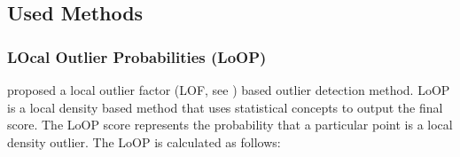 \documentclass[referee]{raa}            %
\begin{document}

\subsection{Used Methods}

\subsubsection{ LOcal Outlier Probabilities (LoOP)}
\citet{kriegel2009loop} proposed a local outlier factor (LOF, see \citet{breunig2000lof}) based outlier detection  method.
LoOP is a local density based method that uses statistical concepts to output the final score.
The LoOP score represents the probability that a particular point is a local density outlier.
The LoOP is calculated as follows\citep{kriegel2009loop}:
\end{document}
